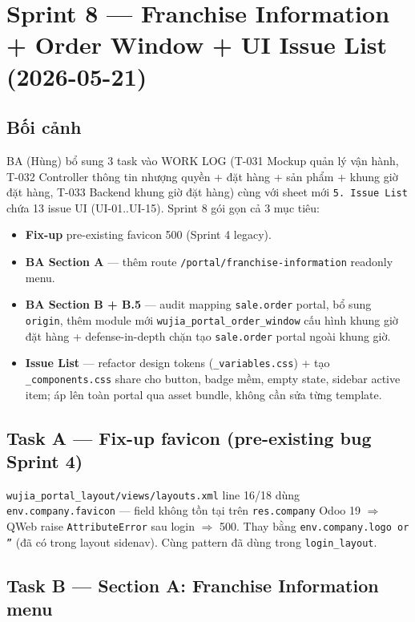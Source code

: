 \chapter{Sprint 8 --- Franchise Information + Order Window + UI Issue List (2026-05-21)}

\section{Bối cảnh}

BA (Hùng) bổ sung 3 task vào WORK LOG (T-031 Mockup quản lý vận hành, T-032
Controller thông tin nhượng quyền + đặt hàng + sản phẩm + khung giờ đặt
hàng, T-033 Backend khung giờ đặt hàng) cùng với sheet mới \texttt{5. Issue
List} chứa 13 issue UI (UI-01..UI-15). Sprint 8 gói gọn cả 3 mục tiêu:

\begin{itemize}[leftmargin=*]
    \item \textbf{Fix-up} pre-existing favicon 500 (Sprint 4 legacy).
    \item \textbf{BA Section A} --- thêm route \texttt{/portal/franchise-information} readonly menu.
    \item \textbf{BA Section B + B.5} --- audit mapping \texttt{sale.order} portal, bổ sung \texttt{origin}, thêm module mới \texttt{wujia\_portal\_order\_window} cấu hình khung giờ đặt hàng + defense-in-depth chặn tạo \texttt{sale.order} portal ngoài khung giờ.
    \item \textbf{Issue List} --- refactor design tokens (\texttt{\_variables.css}) + tạo \texttt{\_components.css} share cho button, badge mềm, empty state, sidebar active item; áp lên toàn portal qua asset bundle, không cần sửa từng template.
\end{itemize}

\section{Task A --- Fix-up favicon (pre-existing bug Sprint 4)}

\texttt{wujia\_portal\_layout/views/layouts.xml} line 16/18 dùng
\texttt{env.company.favicon} --- field không tồn tại trên \texttt{res.company}
Odoo 19 \(\Rightarrow\) QWeb raise \texttt{AttributeError} sau login \(\Rightarrow\)
500. Thay bằng \texttt{env.company.logo or ''} (đã có trong layout sidenav).
Cùng pattern đã dùng trong \texttt{login\_layout}.

\section{Task B --- Section A: Franchise Information menu}

